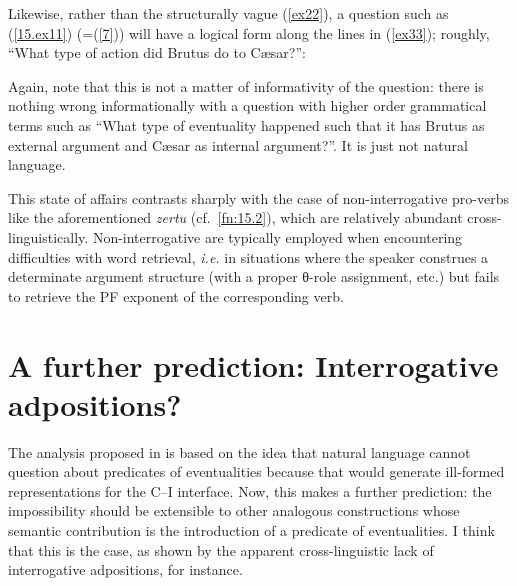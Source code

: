 \documentclass[output=paper]{langsci/langscibook}
\begin{document}
\begin{exe}
\ex
\begin{xlista}
\label{15.ex1}
\label{15.ex2}
\label{15.ex3}
\end{xlista}
\end{exe}

Likewise, rather than the structurally vague (\ref{ex22}), a question such as
(\ref{15.ex11}) (=(\ref{7})) will have a logical form along the lines in
(\ref{ex33}); roughly, ``What type of action did Brutus do to C\ae{}sar?'':

\begin{exe}
\ex
\begin{xlista}
\label{15.ex11}
\label{ex22}
\label{ex33}
\end{xlista}
\end{exe}

Again, note that this is not a matter of informativity of the question: there
is nothing wrong informationally with a question with higher order grammatical
terms such as ``What type of eventuality happened such that it has Brutus as
external argument and C\ae{}sar as internal argument?''. It is just not natural
language.

This state of affairs contrasts sharply with the case of non-interrogative
pro-verbs like the aforementioned  \emph{zertu} (cf.~\cref{fn:15.2}), which
are relatively abundant cross-linguistically. Non-interrogative  are
typically employed when encountering difficulties with word retrieval,
\emph{i.e.} in situations where the speaker construes a determinate argument
structure (with a proper θ-role assignment, etc.) but fails to retrieve the PF
exponent of the corresponding verb.

\section{A further prediction: Interrogative adpositions?}
\label{sec:prediction}
The analysis proposed in  is based on the idea that natural
language cannot question about predicates of eventualities because that would
generate ill-formed representations for the C--I interface. Now, this makes a
further prediction: the impossibility should be extensible to other analogous
constructions whose semantic contribution is the introduction of a predicate of
eventualities. I think that this is the case, as shown by the apparent
cross-linguistic lack of interrogative adpositions, for instance.
\end{document}
